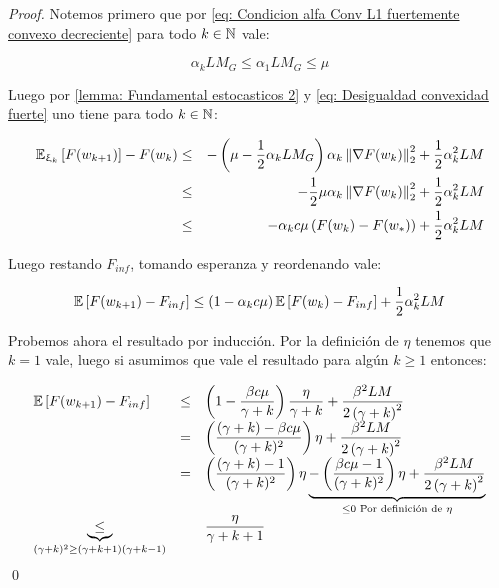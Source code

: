 \begin{proof}
	Notemos primero que por \ref{eq: Condicion alfa Conv L1 fuertemente convexo decreciente} para todo $k \in {\mathbb{N}}$ vale:
	
	\begin{equation*}
		\alpha_k L M_G \leq \alpha_1 L M_G \leq \mu
	\end{equation*}
	
	Luego por \ref{lemma: Fundamental estocasticos 2} y \ref{eq: Desigualdad convexidad fuerte} uno tiene para todo $k \in {\mathbb{N}}$:
	
	\begin{equation*}
	\begin{aligned}
		\mathbb{E}_{\upxi_{k}} \left[F(w_{k+1})\right] - F(w_k) & \leq & - \left( \mu - \frac{1}{2} \alpha_k L M_G \right)\alpha_k \left\lVert\nabla F(w_k)\right\rVert_2^2 + \frac{1}{2} \alpha_k^2 L M \\
		& \leq & - \frac{1}{2} \mu\alpha_k \left\lVert\nabla F(w_k)\right\rVert_2^2 + \frac{1}{2} \alpha_k^2 L M \\
		& \leq & - \alpha_k c \mu \left(F(w_k) - F(w_*)\right) + \frac{1}{2} \alpha_k^2 L M
	\end{aligned}
	\end{equation*}
	
	Luego restando $F_{inf}$, tomando esperanza y reordenando vale:
	
	\begin{equation*}
		\mathbb{E} \left[F(w_{k+1}) - F_{inf}\right] \leq \left(1 - \alpha_k c \mu \right) \mathbb{E} \left[F(w_{k}) - F_{inf}\right]  + \frac{1}{2} \alpha_k^2 L M
	\end{equation*}
	
	Probemos ahora el resultado por inducci\'on. Por la definici\'on de $\eta$ tenemos que $k = 1$ vale, luego si asumimos que vale el resultado para alg\'un $k \geq 1$ entonces:
	
	
	\begin{equation*}
	\begin{array}{lll}
		\mathbb{E} \left[F(w_{k+1}) - F_{inf}\right] & \leq & \left(1 - \dfrac{\beta c \mu }{\gamma + k}\right) \dfrac{\eta}{\gamma + k} + \dfrac{\beta^2 LM}{2 \left(\gamma + k\right)^2} \\
		& = & \left(\dfrac{(\gamma + k) - \beta c \mu }{(\gamma + k)^2}\right) {\eta}+ \dfrac{\beta^2 LM}{2 \left(\gamma + k\right)^2} \\
		& = & \left(\dfrac{(\gamma + k) - 1}{(\gamma + k)^2}\right) {\eta}  \underbrace{- \left(\dfrac{\beta c \mu -1}{(\gamma + k)^2}\right)\eta +  \dfrac{\beta^2 LM}{2 \left(\gamma + k\right)^2}}_{\leq 0 \text{ Por definici\'on de } \eta}\\
		\underbrace{\leq}_{(\gamma + k)^2 \geq (\gamma + k + 1)(\gamma + k - 1)} & & \dfrac{\eta}{\gamma + k + 1}
	\end{array}
	\end{equation*}\qed

\end{proof}